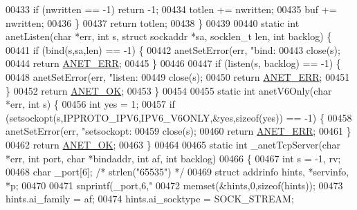 \begin{DoxyCode}
{{{{{{{{{{{{{{{{{{{00433         \textcolor{keywordflow}{if} (nwritten == -1) \textcolor{keywordflow}{return} -1;
00434         totlen += nwritten;
00435         buf += nwritten;
00436     \}
00437     \textcolor{keywordflow}{return} totlen;
00438 \}
00439 
00440 \textcolor{keyword}{static} \textcolor{keywordtype}{int} anetListen(\textcolor{keywordtype}{char} *err, \textcolor{keywordtype}{int} s, \textcolor{keyword}{struct} sockaddr *sa, socklen\_t len, \textcolor{keywordtype}{int} backlog) \{
00441     \textcolor{keywordflow}{if} (bind(s,sa,len) == -1) \{
00442         anetSetError(err, \textcolor{stringliteral}{"bind: %
00443         close(s);
00444         \textcolor{keywordflow}{return} \hyperlink{anet_8h_a0697b7774a7e0f4ef141839fe93536fe}{ANET\_ERR};
00445     \}
00446 
00447     \textcolor{keywordflow}{if} (listen(s, backlog) == -1) \{
00448         anetSetError(err, \textcolor{stringliteral}{"listen: %
00449         close(s);
00450         \textcolor{keywordflow}{return} \hyperlink{anet_8h_a0697b7774a7e0f4ef141839fe93536fe}{ANET\_ERR};
00451     \}
00452     \textcolor{keywordflow}{return} \hyperlink{anet_8h_a25fb91ccc6457153f6d2e21380d4c6cf}{ANET\_OK};
00453 \}
00454 
00455 \textcolor{keyword}{static} \textcolor{keywordtype}{int} anetV6Only(\textcolor{keywordtype}{char} *err, \textcolor{keywordtype}{int} s) \{
00456     \textcolor{keywordtype}{int} yes = 1;
00457     \textcolor{keywordflow}{if} (setsockopt(s,IPPROTO\_IPV6,IPV6\_V6ONLY,&yes,\textcolor{keyword}{sizeof}(yes)) == -1) \{
00458         anetSetError(err, \textcolor{stringliteral}{"setsockopt: %
00459         close(s);
00460         \textcolor{keywordflow}{return} \hyperlink{anet_8h_a0697b7774a7e0f4ef141839fe93536fe}{ANET\_ERR};
00461     \}
00462     \textcolor{keywordflow}{return} \hyperlink{anet_8h_a25fb91ccc6457153f6d2e21380d4c6cf}{ANET\_OK};
00463 \}
00464 
00465 \textcolor{keyword}{static} \textcolor{keywordtype}{int} \_anetTcpServer(\textcolor{keywordtype}{char} *err, \textcolor{keywordtype}{int} port, \textcolor{keywordtype}{char} *bindaddr, \textcolor{keywordtype}{int} af, \textcolor{keywordtype}{int} backlog)
00466 \{
00467     \textcolor{keywordtype}{int} s = -1, rv;
00468     \textcolor{keywordtype}{char} \_port[6];  \textcolor{comment}{/* strlen("65535") */}
00469     \textcolor{keyword}{struct} addrinfo hints, *servinfo, *p;
00470 
00471     snprintf(\_port,6,\textcolor{stringliteral}{"%
00472     memset(&hints,0,\textcolor{keyword}{sizeof}(hints));
00473     hints.ai\_family = af;
00474     hints.ai\_socktype = SOCK\_STREAM;
}}}}}}}}}}}}}}}}}}}}}}}
\end{DoxyCode}
